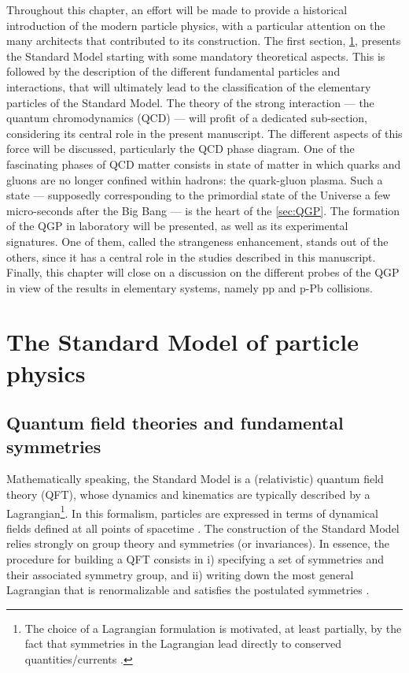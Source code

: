 Throughout this chapter, an effort will be made to provide a historical introduction of the modern particle physics, with a particular attention on the many architects that contributed to its construction. The first section, \Sec\ref{sec:StdModel}, presents the Standard Model starting with some mandatory theoretical aspects. This is followed by the description of the different fundamental particles and interactions, that will ultimately lead to the classification of the elementary particles of the Standard Model. The theory of the strong interaction --- the quantum chromodynamics (QCD) --- will profit of a dedicated sub-section, considering its central role in the present manuscript. The different aspects of this force will be discussed, particularly the QCD phase diagram. One of the fascinating phases of QCD matter consists in state of matter in which quarks and gluons are no longer confined within hadrons: the quark-gluon plasma. Such a state --- supposedly corresponding to the primordial state of the Universe a few micro-seconds after the Big Bang ---  is the heart of the \Sec\ref{sec:QGP}. The formation of the QGP in laboratory will be presented, as well as its experimental signatures. One of them, called the strangeness enhancement, stands out of the others, since it has a central role in the studies described in this manuscript. Finally, this chapter will close on a discussion on the different probes of the QGP in view of the  results in elementary systems, namely pp and p-Pb collisions. 


\section{The Standard Model of particle physics}
\label{sec:StdModel}

\subsection{Quantum field theories and fundamental symmetries}
\label{subsec:Theory}

Mathematically speaking, the Standard Model is a (relativistic) quantum field theory (QFT), whose dynamics and kinematics are typically described by a Lagrangian\footnote{The choice of a Lagrangian formulation is motivated, at least partially, by the fact that symmetries in the Lagrangian lead directly to conserved quantities/currents \cite{kochAspectsChiralSymmetry1997}.}. In this formalism, particles are expressed in terms of dynamical fields defined at all points of spacetime \cite{peskinIntroductionQuantumField2018}. The construction of the Standard Model relies strongly on group theory and symmetries (or invariances). In essence, the procedure for building a QFT consists in i) specifying a set of symmetries and their associated symmetry group, and ii) writing down the most general Lagrangian that is renormalizable and satisfies the postulated symmetries \cite{braibantParticlesFundamentalInteractions2012}.

